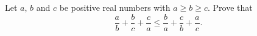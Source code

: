 Let $a$, $b$ and $c$ be positive real numbers with $a\ge b\ge c$. Prove that
\[
\dfrac {a}{b}+\dfrac {b}{c}+\dfrac {c}{a}\le\dfrac {b}{a}+\dfrac {c}{b}+\dfrac {a}{c} .
\]
